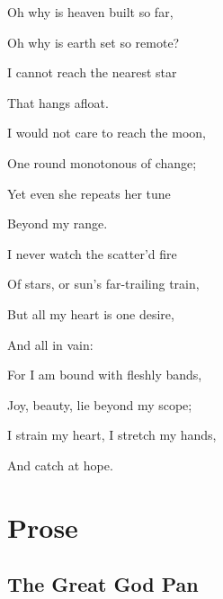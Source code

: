 \documentclass[openany]{book} %
\begin{document}
\begin{center}

\par\noindent Oh why is heaven built so far,
\par\noindent Oh why is earth set so remote?
\par\noindent I cannot reach the nearest star
\par\noindent That hangs afloat.

	\begin{quotation}
		\begin{quotation}
			\begin{quotation}
 \newline
			\end{quotation}
		\end{quotation}
	\end{quotation}

\par\noindent I would not care to reach the moon,
\par\noindent One round monotonous of change;
\par\noindent Yet even she repeats her tune
\par\noindent Beyond my range.
             \newline
\par\noindent I never watch the scatter'd fire
\par\noindent Of stars, or sun's far-trailing train,
\par\noindent But all my heart is one desire,
\par\noindent And all in vain:
             \newline
\par\noindent For I am bound with fleshly bands,
\par\noindent Joy, beauty, lie beyond my scope;
\par\noindent I strain my heart, I stretch my hands,
\par\noindent And catch at hope.

\troisetoiles

\end{center}

\hypertarget{toc5}{}
\pagebreak[\PAGExBREAKxPOLICY]
\chapter{Prose}

\hypertarget{toc6}{}
\pagebreak[\PAGExSUBxBREAKxPOLICY]
\section{The Great God Pan}
\end{document}
